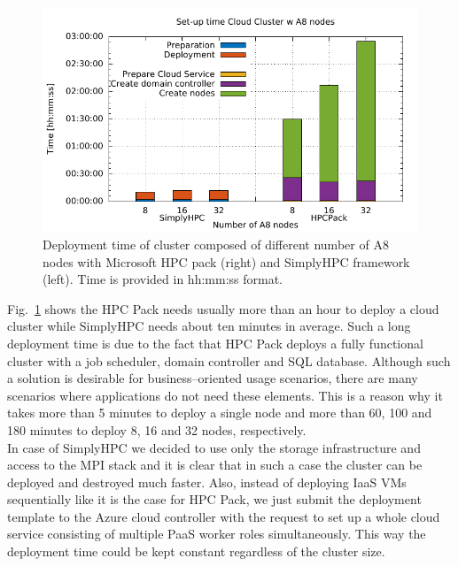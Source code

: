 \documentclass[a4paper,twoside]{article}
\begin{document}
\begin{figure}[h]
\centering
	\includegraphics[width=\linewidth]{gplt-creation-simplyvshpc}
	\caption{Deployment time of cluster composed of different number of A8 nodes with Microsoft HPC pack (right) and SimplyHPC framework (left). Time is provided in hh:mm:ss format.}
	\label{fig:deployTime}
\end{figure}

Fig.~\ref{fig:deployTime} shows the HPC Pack needs usually more than an hour to deploy a cloud cluster while SimplyHPC needs about ten minutes in average. Such a long deployment time is due to the fact that HPC Pack deploys a fully functional cluster with a job scheduler, domain controller and SQL database. Although such a solution is desirable for business--oriented usage scenarios, there are many scenarios where applications do not need these elements. This is a reason why it takes more than 5 minutes to deploy a single node and more than 60, 100 and 180 minutes to deploy 8, 16 and 32 nodes, respectively. \\
In case of SimplyHPC we decided to use only the storage infrastructure and access to the MPI stack and it is clear that in such a case the cluster can be deployed and destroyed much faster. Also, instead of deploying IaaS VMs sequentially like it is the case for HPC Pack, we just submit the deployment template to the Azure cloud controller with the request to set up a whole cloud service consisting of multiple PaaS worker roles simultaneously. This way the deployment time could be kept constant regardless of the cluster size.
\end{document}
